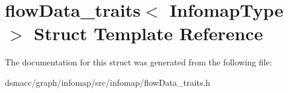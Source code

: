 \hypertarget{structflowData__traits}{}\section{flow\+Data\+\_\+traits$<$ Infomap\+Type $>$ Struct Template Reference}
\label{structflowData__traits}


The documentation for this struct was generated from the following file\+:\begin{DoxyCompactItemize}
\item 
dsmacc/graph/infomap/src/infomap/flow\+Data\+\_\+traits.\+h\end{DoxyCompactItemize}
